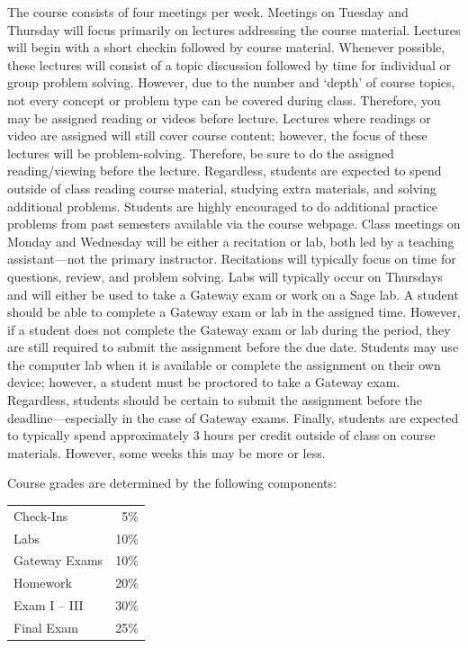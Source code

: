 \documentclass[11pt,letterpaper]{article}
\begin{document}

The course consists of four meetings per week. Meetings on Tuesday and Thursday will focus primarily on lectures addressing the course material. Lectures will begin with a short checkin followed by course material. Whenever possible, these lectures will consist of a topic discussion followed by time for individual or group problem solving. However, due to the number and `depth' of course topics, not every concept or problem type can be covered during class. Therefore, you may be assigned reading or videos before lecture. Lectures where readings or video are assigned will still cover course content; however, the focus of these lectures will be problem-solving. Therefore, be sure to do the assigned reading/viewing before the lecture. Regardless, students are expected to spend outside of class reading course material, studying extra materials, and solving additional problems. Students are highly encouraged to do additional practice problems from past semesters available via the course webpage. Class meetings on Monday and Wednesday will be either a recitation or lab, both led by a teaching assistant---not the primary instructor. Recitations will typically focus on time for questions, review, and problem solving. Labs will typically occur on Thursdays and will either be used to take a Gateway exam or work on a Sage lab. A student should be able to complete a Gateway exam or lab in the assigned time. However, if a student does not complete the Gateway exam or lab during the period, they are still required to submit the assignment before the due date. Students may use the computer lab when it is available or complete the assignment on their own device; however, a student must be proctored to take a Gateway exam. Regardless, students should be certain to submit the assignment before the deadline---especially in the case of Gateway exams. Finally, students are expected to typically spend approximately 3 hours per credit outside of class on
course materials. However, some weeks this may be more or less.
\sectionbreak






Course grades are determined by the following components: \par
	\begin{table}[!ht]
        \begin{tabular}{lr}
	Check-Ins & 5\% \\
	Labs & 10\% \\
	Gateway Exams& 10\% \\
	Homework & 20\% \\
	Exam I -- III & 30\% \\
	Final Exam & 25\%
        \end{tabular} 
        \end{table}
\pspace
\end{document}
